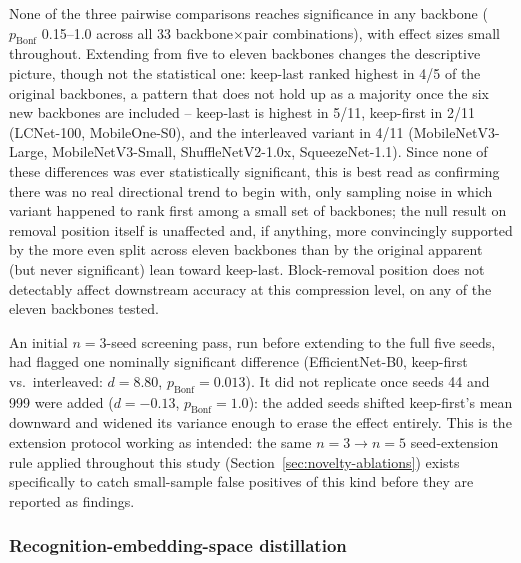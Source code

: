 \documentclass[11pt]{article}
\begin{document}
None of the three pairwise comparisons reaches significance in any backbone ($p_{\text{Bonf}}$ 0.15--1.0 across all 33 backbone$\times$pair combinations), with effect sizes small throughout. Extending from five to eleven backbones changes the descriptive picture, though not the statistical one: keep-last ranked highest in 4/5 of the original backbones, a pattern that does not hold up as a majority once the six new backbones are included -- keep-last is highest in 5/11, keep-first in 2/11 (LCNet-100, MobileOne-S0), and the interleaved variant in 4/11 (MobileNetV3-Large, MobileNetV3-Small, ShuffleNetV2-1.0x, SqueezeNet-1.1). Since none of these differences was ever statistically significant, this is best read as confirming there was no real directional trend to begin with, only sampling noise in which variant happened to rank first among a small set of backbones; the null result on removal position itself is unaffected and, if anything, more convincingly supported by the more even split across eleven backbones than by the original apparent (but never significant) lean toward keep-last. Block-removal position does not detectably affect downstream accuracy at this compression level, on any of the eleven backbones tested.

An initial $n=3$-seed screening pass, run before extending to the full five seeds, had flagged one nominally significant difference (EfficientNet-B0, keep-first vs.\ interleaved: $d=8.80$, $p_{\text{Bonf}}=0.013$). It did not replicate once seeds 44 and 999 were added ($d=-0.13$, $p_{\text{Bonf}}=1.0$): the added seeds shifted keep-first's mean downward and widened its variance enough to erase the effect entirely. This is the extension protocol working as intended: the same $n=3\to n=5$ seed-extension rule applied throughout this study (Section~\ref{sec:novelty-ablations}) exists specifically to catch small-sample false positives of this kind before they are reported as findings.

\subsubsection{Recognition-embedding-space distillation}
\end{document}
